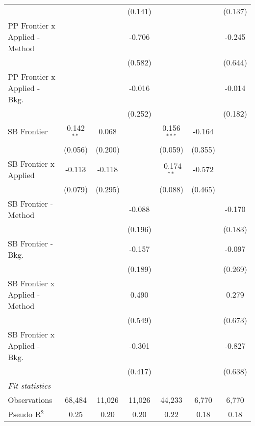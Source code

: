 \begin{tabular}{lcccccc}
                                  &               &              & (0.141)       &               &              & (0.137)\\   
   PP Frontier x Applied - Method &               &              & -0.706        &               &              & -0.245\\   
                                  &               &              & (0.582)       &               &              & (0.644)\\   
   PP Frontier x Applied - Bkg.   &               &              & -0.016        &               &              & -0.014\\   
                                  &               &              & (0.252)       &               &              & (0.182)\\   
   SB Frontier                    & 0.142$^{**}$  & 0.068        &               & 0.156$^{***}$ & -0.164       &   \\   
                                  & (0.056)       & (0.200)      &               & (0.059)       & (0.355)      &   \\   
   SB Frontier x Applied          & -0.113        & -0.118       &               & -0.174$^{**}$ & -0.572       &   \\   
                                  & (0.079)       & (0.295)      &               & (0.088)       & (0.465)      &   \\   
   SB Frontier - Method           &               &              & -0.088        &               &              & -0.170\\   
                                  &               &              & (0.196)       &               &              & (0.183)\\   
   SB Frontier - Bkg.             &               &              & -0.157        &               &              & -0.097\\   
                                  &               &              & (0.189)       &               &              & (0.269)\\   
   SB Frontier x Applied - Method &               &              & 0.490         &               &              & 0.279\\   
                                  &               &              & (0.549)       &               &              & (0.673)\\   
   SB Frontier x Applied - Bkg.   &               &              & -0.301        &               &              & -0.827\\   
                                  &               &              & (0.417)       &               &              & (0.638)\\   
   \midrule
   \emph{Fit statistics}\\
   Observations                   & 68,484        & 11,026       & 11,026        & 44,233        & 6,770        & 6,770\\  
   Pseudo R$^2$                   & 0.25          & 0.20         & 0.20          & 0.22          & 0.18         & 0.18\\  
   

\end{tabular}
